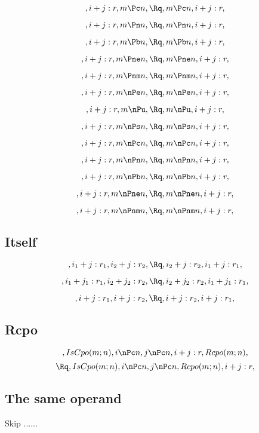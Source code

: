 \[, i+j:r, m \Pc n, \Rq , m \Pc n, i+j:r,\]

\[, i+j:r, m \Pn n, \Rq , m \Pn n, i+j:r,\]

\[, i+j:r, m \Pb n, \Rq , m \Pb n, i+j:r,\]

\[, i+j:r, m \Pne n, \Rq , m \Pne n, i+j:r,\]

\[, i+j:r, m \Pnm n, \Rq , m \Pnm n, i+j:r,\]


\[, i+j:r, m \nPe n, \Rq , m \nPe n, i+j:r,\]

\[, i+j:r, m \nPu, \Rq , m \nPu, i+j:r,\]

\[, i+j:r, m \nPs n, \Rq , m \nPs n, i+j:r,\]

\[, i+j:r, m \nPc n, \Rq , m \nPc n, i+j:r,\]

\[, i+j:r, m \nPn n, \Rq , m \nPn n, i+j:r,\]

\[, i+j:r, m \nPb n, \Rq , m \nPb n, i+j:r,\]

\[, i+j:r, m \nPne n, \Rq , m \nPne n, i+j:r,\]

\[, i+j:r, m \nPnm n, \Rq , m \nPnm n, i+j:r,\]


\bigskip
\bigskip
\subsection{Itself}
\[, i_1+j:r_1, i_2+j:r_2, \Rq , i_2+j:r_2, i_1+j:r_1,\]

\[, i_1+j_1:r_1, i_2+j_2:r_2, \Rq , i_2+j_2:r_2, i_1+j_1:r_1,\]

\[, i+j:r_1, i+j:r_2, \Rq , i+j:r_2, i+j:r_1,\]

\bigskip
\bigskip
\subsection{Rcpo}
\[, IsCpo(m;n), i \nPc n, j \nPc n, i+j:r, Rcpo(m;n), \]
\[\Rq , IsCpo(m;n), i \nPc n, j \nPc n, Rcpo(m;n), i+j:r,\]


\bigskip
\bigskip
\subsection{The same operand}
Skip ......


\bigskip
\bigskip
